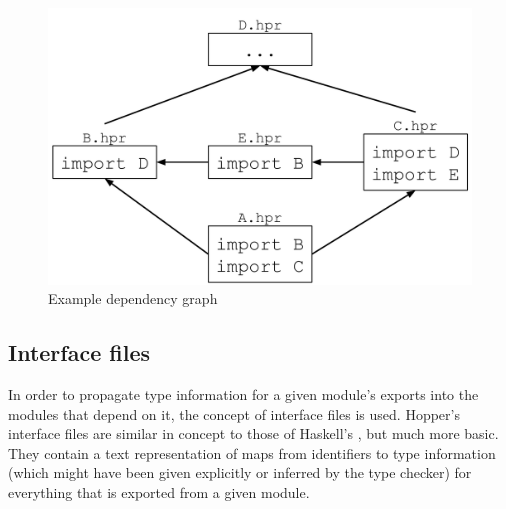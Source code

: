 \begin{figure}[h!]
\centering
  \includegraphics[width=0.6\pdfpagewidth]{figure/depgraph}
  \caption{Example dependency graph}
  \label{fig:depgraph}
\end{figure}

\subsection{Interface files}

In order to propagate type information for a given module's exports into the modules that depend on it, the concept of interface files is used. Hopper's interface files are similar in concept to those of Haskell's \cite{interfacefiles}, but much more basic. They contain a text representation of maps from identifiers to type information (which might have been given explicitly or inferred by the type checker) for everything that is exported from a given module.
